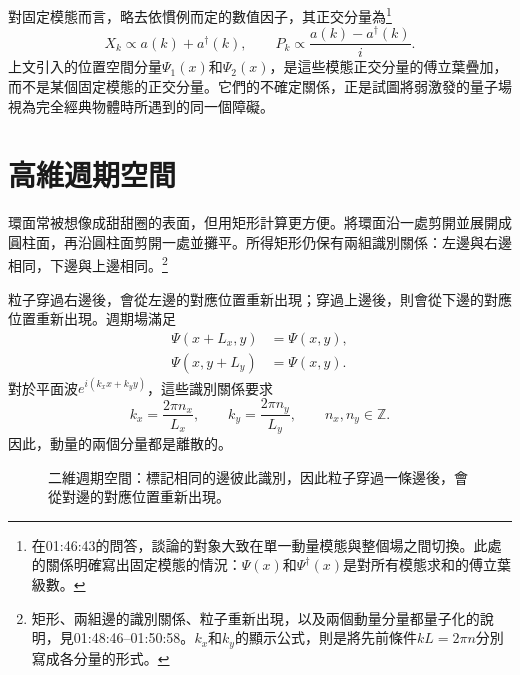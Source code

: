 對固定模態而言，略去依慣例而定的數值因子，其正交分量為\footnote{在01:46:43的問答，談論的對象大致在單一動量模態與整個場之間切換。此處的關係明確寫出固定模態的情況：\(\Psi(x)\)和\(\Psi^\dagger(x)\)是對所有模態求和的傅立葉級數。}
\begin{equation}
X_k\propto a(k)+a^\dagger(k),
\qquad
P_k\propto \frac{a(k)-a^\dagger(k)}{i}.
\end{equation}
上文引入的位置空間分量\(\Psi_1(x)\)和\(\Psi_2(x)\)，是這些模態正交分量的傅立葉疊加，而不是某個固定模態的正交分量。它們的不確定關係，正是試圖將弱激發的量子場視為完全經典物體時所遇到的同一個障礙。

\section{高維週期空間}

\begin{classroomqa}
\end{classroomqa}

環面常被想像成甜甜圈的表面，但用矩形計算更方便。將環面沿一處剪開並展開成圓柱面，再沿圓柱面剪開一處並攤平。所得矩形仍保有兩組識別關係：左邊與右邊相同，下邊與上邊相同。\footnote{矩形、兩組邊的識別關係、粒子重新出現，以及兩個動量分量都量子化的說明，見01:48:46--01:50:58。\(k_x\)和\(k_y\)的顯示公式，則是將先前條件\(kL=2\pi n\)分別寫成各分量的形式。}

粒子穿過右邊後，會從左邊的對應位置重新出現；穿過上邊後，則會從下邊的對應位置重新出現。週期場滿足
\begin{align}
\Psi(x+L_x,y)&=\Psi(x,y),\\
\Psi(x,y+L_y)&=\Psi(x,y).
\end{align}
對於平面波\(e^{i(k_x x+k_y y)}\)，這些識別關係要求
\begin{equation}
k_x=\frac{2\pi n_x}{L_x},
\qquad
k_y=\frac{2\pi n_y}{L_y},
\qquad
n_x,n_y\in\mathbb Z.
\end{equation}
因此，動量的兩個分量都是離散的。

\begin{figure}[t]
\centering
{}
\caption{二維週期空間：標記相同的邊彼此識別，因此粒子穿過一條邊後，會從對邊的對應位置重新出現。}
\end{figure}

